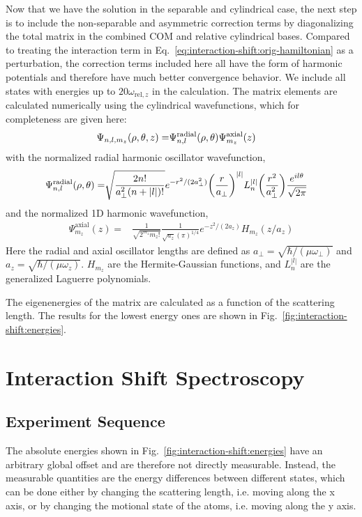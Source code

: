 Now that we have the solution in the separable and cylindrical case,
the next step is to include the non-separable and asymmetric correction terms
by diagonalizing the total matrix in the combined COM and relative cylindrical bases.
Compared to treating the interaction term in Eq.~\ref{eq:interaction-shift:orig-hamiltonian}
as a perturbation, the correction terms included here all have the form of
harmonic potentials and therefore have much better convergence behavior.
We include all states with energies up to $20 \omega_{\mathrm{rel},z}$ in the calculation.
The matrix elements are calculated numerically using the cylindrical wavefunctions,
which for completeness are given here:
\begin{align*}
  \Psi_{n,l,m_z}{\left({\rho,\theta,z}\right)}=
  &\Psi^{\mathrm{radial}}_{n,l}{\left({\rho, \theta}\right)}\Psi^{\mathrm{axial}}_{m_z}{\left({z}\right)}
\end{align*}
with the normalized radial harmonic oscillator wavefunction,
\begin{align*}
  \Psi^{\mathrm{radial}}_{n,l}{\left({\rho, \theta}\right)}=
  &\sqrt{\frac{2n!}{a_\perp^2 (n+|l|)!}} e^{-r^2/(2 a_\perp^2)} {\left({\frac{r}{a_\perp}}\right)}^{|l|}
    L_n^{|l|}{\left({\frac{r^2}{a_\perp^2}}\right)} \frac{ e^{i l \theta}}{\sqrt{2 \pi}}
\end{align*}
and the normalized 1D harmonic wavefunction,
\begin{align*}
  \Psi^{\mathrm{axial}}_{m_z}(z)=&\frac{1}{\sqrt{2^{m_z} m_z!}} \frac{1}{\sqrt{a_z}(\pi)^{1/4}}
                                   e^{-z^2/(2 a_z)} H_{m_z}(z/a_z)
\end{align*}
Here the radial and axial oscillator lengths are defined as
$a_\perp = \sqrt{\hbar/(\mu \omega_\perp)}$ and $a_z = \sqrt{\hbar/ (\mu \omega_z)}$.
$H_{m_z}$ are the Hermite-Gaussian functions,
and $L^{|l|}_n$ are the generalized Laguerre polynomials.

The eigenenergies of the matrix are calculated as a function of the scattering length.
The results for the lowest energy ones are shown in Fig.~\ref{fig:interaction-shift:energies}.

\section{Interaction Shift Spectroscopy}
\label{ch:interaction-shift:spectroscopy}

\subsection{Experiment Sequence}
\label{ch:interaction-shift:spectroscopy:sequence}
The absolute energies shown in Fig.~\ref{fig:interaction-shift:energies} have an arbitrary global
offset and are therefore not directly measurable.
Instead, the measurable quantities are the energy differences between different states,
which can be done either by changing the scattering length, i.e. moving along the x axis,
or by changing the motional state of the atoms, i.e. moving along the y axis.

